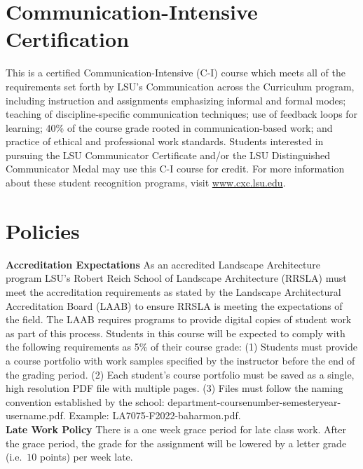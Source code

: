 \documentclass[11pt,article,oneside]{memoir}
\begin{document}

\section{Communication-Intensive Certification}
This is a certified Communication-Intensive (C-I) course which meets all of the requirements set forth by LSU's Communication across the Curriculum program, including
instruction and assignments emphasizing informal and formal modes;
teaching of discipline-specific communication techniques;
use of feedback loops for learning;
40\% of the course grade rooted in communication-based work; 
and practice of ethical and professional work standards.
Students interested in pursuing the LSU Communicator Certificate and/or the LSU Distinguished Communicator Medal may use this C-I course for credit. For more information about these student recognition programs, visit \url{www.cxc.lsu.edu}.\\

\section{Policies}

\noindent \textbf{Accreditation Expectations}
As an accredited Landscape Architecture program
LSU's Robert Reich School of Landscape Architecture (RRSLA) 
must meet the accreditation requirements 
as stated by the Landscape Architectural Accreditation
Board (LAAB) to ensure RRSLA is meeting the expectations of the field. 
The LAAB requires programs to provide digital copies 
of student work as part of this process.
Students in this course will be expected 
to comply with the following requirements
as 5\% of their course grade: 
(1) Students must provide a course portfolio
with work samples specified by the instructor 
before the end of the grading period. 
(2) Each student's course portfolio must be saved as 
a single, high resolution PDF file with multiple pages. 
(3) Files must follow the naming convention
established by the school: department-coursenumber-semesteryear-username.pdf.
Example: LA7075-F2022-baharmon.pdf.\\

\noindent \textbf{Late Work Policy}
There is a one week grace period for late class work. 
After the grace period, 
the grade for the assignment will be lowered by
a letter grade (i.e.~$10$ points) per week late.\\
\end{document}
